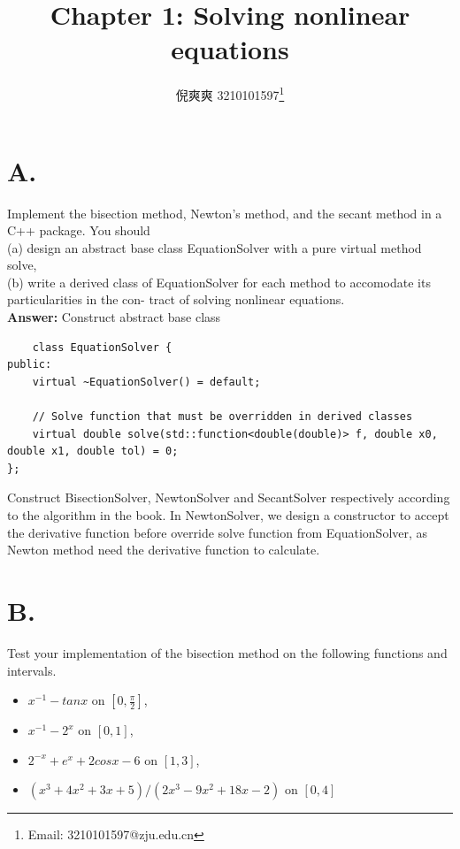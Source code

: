\documentclass{article}
\title{Chapter 1: Solving nonlinear equations}
\author{倪爽爽 3210101597\thanks{Email: 3210101597@zju.edu.cn}}
\begin{document}
\begin{CJK}{UTF8}{gbsn}
\maketitle


\section*{A.}

Implement the bisection method, Newton’s method, and the secant method in a C++ package. You should\\
(a) design an abstract base class EquationSolver with a pure virtual method solve,\\
(b) write a derived class of EquationSolver for each method to accomodate its particularities in the con- tract of solving nonlinear equations.\\


\textbf{Answer: }
Construct abstract base class
\begin{verbatim}
    class EquationSolver {
public:
    virtual ~EquationSolver() = default;

    // Solve function that must be overridden in derived classes
    virtual double solve(std::function<double(double)> f, double x0, double x1, double tol) = 0;
};
\end{verbatim}
Construct BisectionSolver, NewtonSolver and SecantSolver respectively according to the algorithm in the book. In NewtonSolver, we design a constructor to accept the derivative function before override solve function from EquationSolver, as Newton method need the derivative function to calculate.



\section*{B.}
Test your implementation of the bisection method on the following functions and intervals.
\begin{itemize}
    \item $x^{-1} - tan x$ on $[0, \frac{\pi}{2} ]$,
    \item $x^{-1} - 2^x$ on $[0, 1]$,
    \item $2^{-x} +e^x +2cosx-6$ on $[1,3]$,
    \item $(x^3 +4x^2 +3x+5)/(2x^3 - 9x^2 +18x - 2)$ on $[0,4]$
\end{itemize}


\end{CJK}
\end{document}
